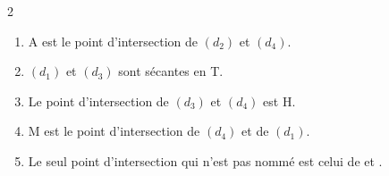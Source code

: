 \documentclass[10pt,a4paper]{article}
\begin{document}
\begin{multicols}{2}
\begin{enumerate}[itemsep=1em]
\item A est le point d'intersection de $(d_2)$ et $(d_4)$.

\item $(d_1)$ et $(d_3)$ sont sécantes en T.

\item Le point d'intersection de $(d_3)$ et $(d_4)$ est H.

\item M est le point d'intersection de $(d_4)$ et de $(d_1)$.

\item Le seul point d'intersection qui n'est pas nommé est celui de \dotfill et \dotfill .
\end{enumerate}

\end{multicols}
\end{document}
